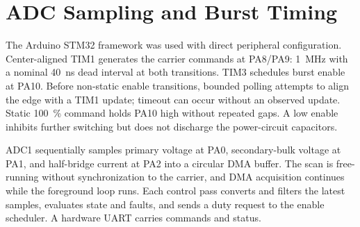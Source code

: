 \section{ADC Sampling and Burst Timing}
\label{sec:ctrl-architecture}

The Arduino STM32 framework was used with direct peripheral configuration. Center-aligned TIM1 generates the carrier commands at PA8/PA9: \SI{1}{\mega\hertz} with a nominal \SI{40}{\nano\second} dead interval at both transitions. TIM3 schedules burst enable at PA10. Before non-static enable transitions, bounded polling attempts to align the edge with a TIM1 update; timeout can occur without an observed update. Static \SI{100}{\percent} command holds PA10 high without repeated gaps. A low enable inhibits further switching but does not discharge the power-circuit capacitors.

ADC1 sequentially samples primary voltage at PA0, secondary-bulk voltage at PA1, and half-bridge current at PA2 into a circular DMA buffer. The scan is free-running without synchronization to the carrier, and DMA acquisition continues while the foreground loop runs. Each control pass converts and filters the latest samples, evaluates state and faults, and sends a duty request to the enable scheduler. A hardware UART carries commands and status.

